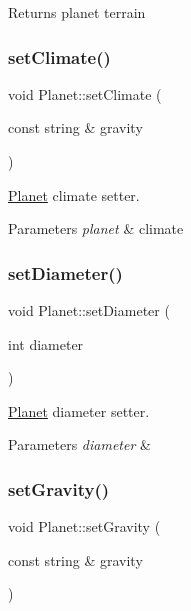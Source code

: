 \begin{DoxyReturn}{Returns}
planet terrain 
\end{DoxyReturn}
\mbox{\label{class_planet_a77ae00b49eba800190e8dea28c2070d8}} 
\subsubsection{\texorpdfstring{set\+Climate()}{setClimate()}}
{\footnotesize\ttfamily void Planet\+::set\+Climate (\begin{DoxyParamCaption}\item[{const string \&}]{gravity }\end{DoxyParamCaption})}



\hyperlink{class_planet}{Planet} climate setter. 


\begin{DoxyParams}{Parameters}
{\em planet} & climate \\
\hline
\end{DoxyParams}
\mbox{\label{class_planet_aff945fd3df2601899e532134f7d9718e}} 
\subsubsection{\texorpdfstring{set\+Diameter()}{setDiameter()}}
{\footnotesize\ttfamily void Planet\+::set\+Diameter (\begin{DoxyParamCaption}\item[{int}]{diameter }\end{DoxyParamCaption})}



\hyperlink{class_planet}{Planet} diameter setter. 


\begin{DoxyParams}{Parameters}
{\em diameter} & \\
\hline
\end{DoxyParams}
\mbox{\label{class_planet_a47d2253e276b9fcf41422b67f7ed0646}} 
\subsubsection{\texorpdfstring{set\+Gravity()}{setGravity()}}
{\footnotesize\ttfamily void Planet\+::set\+Gravity (\begin{DoxyParamCaption}\item[{const string \&}]{gravity }\end{DoxyParamCaption})}



